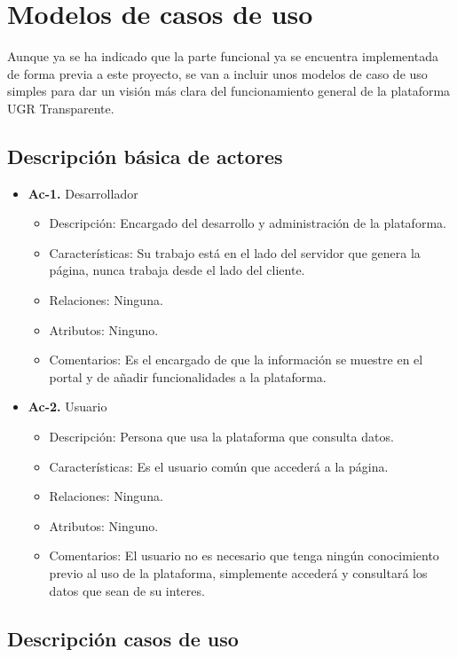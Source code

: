 \section{Modelos de casos de uso}

Aunque ya se ha indicado que la parte funcional ya se encuentra implementada de forma previa a este proyecto, se van a incluir
unos modelos de caso de uso simples para dar un visión más clara del funcionamiento general de la plataforma UGR Transparente.

\subsection{Descripción básica de actores}

\begin{itemize}
  \item \textbf{Ac-1.} Desarrollador
  \begin{itemize}
   \item Descripción: Encargado del desarrollo y administración de la plataforma.
   \item Características: Su trabajo está en el lado del servidor que genera la página, nunca trabaja desde el lado del cliente.
   \item Relaciones: Ninguna.
   \item Atributos: Ninguno.
   \item Comentarios: Es el encargado de que la información se muestre en el portal y de añadir funcionalidades a la plataforma.
  \end{itemize}
  
  \item \textbf{Ac-2.} Usuario
  \begin{itemize}
   \item Descripción: Persona que usa la plataforma que consulta datos.
   \item Características: Es el usuario común que accederá a la página.
   \item Relaciones: Ninguna.
   \item Atributos: Ninguno.
   \item Comentarios: El usuario no es necesario que tenga ningún conocimiento previo al uso de la plataforma, simplemente
   accederá y consultará los datos que sean de su interes.
  \end{itemize}
\end{itemize}

\subsection{Descripción casos de uso}

